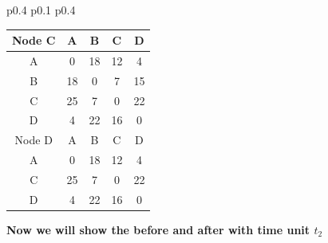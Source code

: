 \documentclass{article}
\begin{document}
\begin{tabular}{p{0.4\linewidth} p{0.1\linewidth} p{0.4\linewidth}}
\begin{tabular}{c|c|c|c|c}
    \hline
    \hline
    Node C & A & B & C & D \\
    \hline
    A & 0 & 18 & 12 & 4 \\
    B & 18 & 0 & 7 & 15 \\
    C & 25 & 7 & 0 & \color{red}22 \\
    D & 4 & 22 & 16 & 0 \\
    \hline
    \hline
    Node D & A & B & C & D \\
    \hline
    A & 0 & 18 & 12 & 4 \\
    C & 25 & 7 & 0 & 22 \\
    D & 4 & 22 & 16 & 0 \\
    \hline
\end{tabular}
\end{tabular}

\textbf{Now we will show the before and after with time unit $t_2$}\\
\newline
\end{document}
